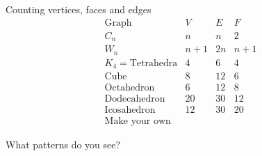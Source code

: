 \documentclass{beamer}
\begin{document}
\begin{frame}{Counting vertices, faces and edges}
  $$\begin{array}{c|c|c|c}
    \text{Graph} & V & E & F  \\ \hline
    C_n & n & n & 2 \\
    W_n & n+1 & 2n & n+1 \\
    K_4=\text{Tetrahedra} & 4 & 6 & 4 \\
    \text{Cube} & 8 & 12 & 6 \\
    \text{Octahedron} & 6 & 12 & 8 \\
    \text{Dodecahedron} & 20 & 30 & 12 \\
    \text{Icosahedron} & 12 & 30 & 20 \\
    \text{Make your own} & & & 
  \end{array}
  $$
\begin{block}{What patterns do you see?}
  \end{block}
  \end{frame}
\end{document}
